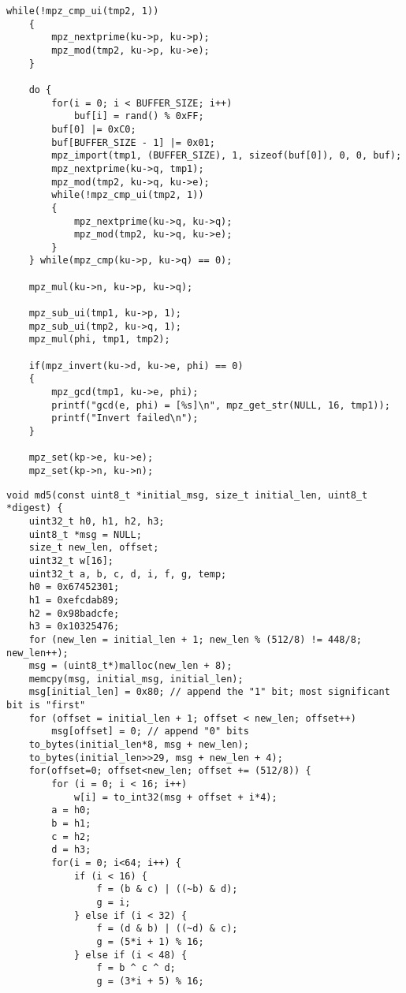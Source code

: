 \begin{center}
    \captionsetup{justification=raggedright,singlelinecheck=off}
    \begin{lstlisting}[label=lst:rsa2,caption=Реализация алгоритма получения ключей RSA часть 2]
  while(!mpz_cmp_ui(tmp2, 1))
    {
        mpz_nextprime(ku->p, ku->p);   
        mpz_mod(tmp2, ku->p, ku->e);
    }

    do {
        for(i = 0; i < BUFFER_SIZE; i++)
            buf[i] = rand() % 0xFF;
        buf[0] |= 0xC0;
        buf[BUFFER_SIZE - 1] |= 0x01;
        mpz_import(tmp1, (BUFFER_SIZE), 1, sizeof(buf[0]), 0, 0, buf);
        mpz_nextprime(ku->q, tmp1);
        mpz_mod(tmp2, ku->q, ku->e);
        while(!mpz_cmp_ui(tmp2, 1))
        {
            mpz_nextprime(ku->q, ku->q);
            mpz_mod(tmp2, ku->q, ku->e);
        }
    } while(mpz_cmp(ku->p, ku->q) == 0);

    mpz_mul(ku->n, ku->p, ku->q);

    mpz_sub_ui(tmp1, ku->p, 1);
    mpz_sub_ui(tmp2, ku->q, 1);
    mpz_mul(phi, tmp1, tmp2);

    if(mpz_invert(ku->d, ku->e, phi) == 0)
    {
        mpz_gcd(tmp1, ku->e, phi);
        printf("gcd(e, phi) = [%s]\n", mpz_get_str(NULL, 16, tmp1));
        printf("Invert failed\n");
    }

    mpz_set(kp->e, ku->e);
    mpz_set(kp->n, ku->n);
\end{lstlisting}
\end{center}

\clearpage

\begin{center}
    \captionsetup{justification=raggedright,singlelinecheck=off}
    \begin{lstlisting}[label=lst:md5-1,caption=Реализация алгоритма хеширования MD5 часть 1]
void md5(const uint8_t *initial_msg, size_t initial_len, uint8_t *digest) {
    uint32_t h0, h1, h2, h3;
    uint8_t *msg = NULL;
    size_t new_len, offset;
    uint32_t w[16];
    uint32_t a, b, c, d, i, f, g, temp;
    h0 = 0x67452301;
    h1 = 0xefcdab89;
    h2 = 0x98badcfe;
    h3 = 0x10325476;
    for (new_len = initial_len + 1; new_len % (512/8) != 448/8; new_len++);
    msg = (uint8_t*)malloc(new_len + 8);
    memcpy(msg, initial_msg, initial_len);
    msg[initial_len] = 0x80; // append the "1" bit; most significant bit is "first"
    for (offset = initial_len + 1; offset < new_len; offset++)
        msg[offset] = 0; // append "0" bits
    to_bytes(initial_len*8, msg + new_len);
    to_bytes(initial_len>>29, msg + new_len + 4);
    for(offset=0; offset<new_len; offset += (512/8)) {
        for (i = 0; i < 16; i++)
            w[i] = to_int32(msg + offset + i*4);
        a = h0;
        b = h1;
        c = h2;
        d = h3;
        for(i = 0; i<64; i++) {
            if (i < 16) {
                f = (b & c) | ((~b) & d);
                g = i;
            } else if (i < 32) {
                f = (d & b) | ((~d) & c);
                g = (5*i + 1) % 16;
            } else if (i < 48) {
                f = b ^ c ^ d;
                g = (3*i + 5) % 16;
\end{lstlisting}
\end{center}

